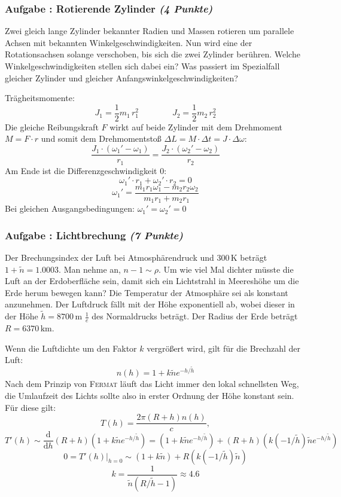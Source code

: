 \documentclass[12pt,a4paper]{article}
\newcommand{\unit}[1]{\,\mathrm{#1}}
\newcommand{\dif}{\mathrm{d}}
\newcommand{\tdif}[2]{\frac{\dif#1}{\dif#2}}
\newcounter{numlabel}
\newenvironment{problem}[2]{\stepcounter{numlabel} \vspace{1ex} \subsubsection*{Aufgabe \the\value{numlabel}: #1 \emph{(#2 Punkte)}} \renewcommand{\Currentlabel}{Aufgabe \the\value{numlabel}: #1}}{

}
\begin{document}
\begin{problem}{Rotierende Zylinder}{4}
Zwei gleich lange Zylinder bekannter Radien und Massen rotieren um parallele Achsen mit bekannten Winkelgeschwindigkeiten. Nun wird eine der Rotationsachsen solange verschoben, bis sich die zwei Zylinder berühren. Welche Winkelgeschwindigkeiten stellen sich dabei ein? Was passiert im Spezialfall gleicher Zylinder und gleicher Anfangswinkelgeschwindigkeiten?
\begin{solution}
Trägheitsmomente:
\[
 J_1 = \frac 1 2 m_1\,r_1^2 \qquad\qquad J_2 = \frac 1 2 m_2\,r_2^2
\]
Die gleiche Reibungskraft $F$ wirkt auf beide Zylinder mit dem Drehmoment $M = F\cdot r$ und somit dem Drehmomentstoß $\Delta L = M\cdot\Delta t = J\cdot\Delta\omega$:
\[
 \frac{J_1\cdot(\omega_1'-\omega_1)}{r_1} = \frac{J_2\cdot(\omega_2'-\omega_2)}{r_2}
\]
Am Ende ist die Differenzgeschwindigkeit 0:
\[
 \omega_1'\cdot r_1 + \omega_2'\cdot r_2 = 0
\]
\[
 \omega_1' = \frac{m_1r_1\omega_1-m_2r_2\omega_2}{m_1r_1+m_2r_1}
\]
Bei gleichen Ausgangsbedingungen: $\omega_1' = \omega_2' = 0$
\end{solution}
\end{problem}

\begin{problem}{Lichtbrechung}{7}
Der Brechungsindex der Luft bei Atmosphärendruck und $300\unit{K}$ beträgt $1+\tilde n = 1.0003$. Man nehme an, $n-1 \sim \rho$. Um wie viel Mal dichter müsste die Luft an der Erdoberfläche sein, damit sich ein Lichtstrahl in Meereshöhe um die Erde herum bewegen kann? Die Temperatur der Atmosphäre sei als konstant anzunehmen. Der Luftdruck fällt mit der Höhe exponentiell ab, wobei dieser in der Höhe $\tilde h = 8700\unit{m}$ $\frac 1e$ des Normaldrucks beträgt. Der Radius der Erde beträgt $R=6370\unit{km}$.
\begin{solution}
Wenn die Luftdichte um den Faktor $k$ vergrößert wird, gilt für die Brechzahl der Luft:
\[
n(h) = 1 + k \tilde n  e^{-h / \tilde h}
\]
Nach dem Prinzip von \textsc{Fermat} läuft das Licht immer den lokal schnellsten Weg, die Umlaufzeit des Lichts sollte also in erster Ordnung der Höhe konstant sein. Für diese gilt:
\[
T(h) = \frac{2 \pi (R+h) n(h)}{c},
\]
\[
T'(h) \sim \tdif{}{h} (R+h)(1 + k \tilde n  e^{-h / \tilde h}) = (1 + k \tilde n  e^{-h / \tilde h})+(R+h)(k (-1/\tilde h) \tilde n  e^{-h / \tilde h})
\]
\[
0 = \left. T'(h) \right|_{h=0} \sim (1 + k \tilde n)+R (k (-1/\tilde h) \tilde n)
\]
\[
k = \frac{1}{\tilde n (R/ \tilde h - 1)} \approx 4.6
\]
\end{solution}
\end{problem}
\end{document}
